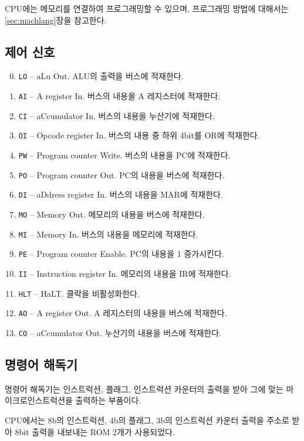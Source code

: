 \documentclass{article}
\begin{document}
CPU에는 메모리를 연결하여 프로그래밍할 수 있으며,
프로그래밍 방법에 대해서는 \ref{sec:machlang}장을 참고한다.

\subsection{제어 신호}

\begin{enumerate}
    \setcounter{enumi}{-1}
    \item \texttt{LO} -- aLu Out. ALU의 출력을 버스에 적재한다.
    \item \texttt{AI} -- A register In. 버스의 내용을 A 레지스터에 적재한다.
    \item \texttt{CI} -- aCcumulator In. 버스의 내용을 누산기에 적재한다.
    \item \texttt{OI} -- Opcode register In. 버스의 내용 중 하위 4bit를 OR에 적재한다.
    \item \texttt{PW} -- Program counter Write. 버스의 내용을 PC에 적재한다.
    \item \texttt{PO} -- Program counter Out. PC의 내용을 버스에 적재한다.
    \item \texttt{DI} -- aDdress register In. 버스의 내용을 MAR에 적재한다.
    \item \texttt{MO} -- Memory Out. 메모리의 내용을 버스에 적재한다.
    \item \texttt{MI} -- Memory In. 버스의 내용을 메모리에 적재한다.
    \item \texttt{PE} -- Program counter Enable. PC의 내용을 1 증가시킨다.
    \item \texttt{II} -- Instruction register In. 메모리의 내용을 IR에 적재한다.
    \item \texttt{HLT} -- HaLT. 클락을 비활성화한다.
    \item \texttt{AO} -- A register Out. A 레지스터의 내용을 버스에 적재한다.
    \item \texttt{CO} -- aCcumulator Out. 누산기의 내용을 버스에 적재한다.
\end{enumerate}

\subsection{명령어 해독기}

명령어 해독기는 인스트럭션, 플래그, 인스트럭션 카운터의 출력을 받아
그에 맞는 마이크로인스트럭션을 출력하는 부품이다.

CPU에서는 8b의 인스트럭션, 4b의 플래그, 3b의 인스트럭션 카운터 출력을 주소로 받아
8bit 출력을 내보내는 ROM 2개가 사용되었다.
\end{document}
